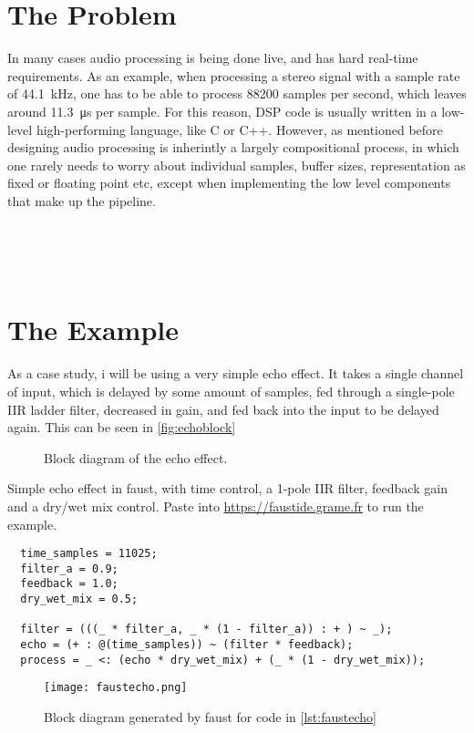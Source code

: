 \section{The Problem}

In many cases audio processing is being done live, and has hard real-time requirements. As an example, when
processing a stereo signal with a sample rate of \SI{44.1}{kHz}, one has to be able to process
\num{88200} samples per second, which leaves around \SI{11.3}{\micro\second} per sample. For this
reason, DSP code is usually written in a low-level high-performing language, like C or C++. However, as
mentioned before designing audio processing is inherintly a largely compositional process, in which one
rarely needs to worry about individual samples, buffer sizes, representation as fixed or floating point etc,
except when implementing the low level components that make up the pipeline.

 \\
 \\
 \\

\section{The Example}

As a case study, i will be using a very simple echo effect. It takes a single channel of input, which is
delayed by some amount of samples, fed through a single-pole IIR ladder filter, decreased in gain, and fed
back into the input to be delayed again. This can be seen in \autoref{fig:echoblock}

\begin{figure}
  \centering
  
  \caption{Block diagram of the echo effect.}
  \label{fig:echoblock}
\end{figure}

\begin{listing}
  \label{lst:faustecho}
  \caption{
    Simple echo effect in faust, with time control, a 1-pole IIR filter, feedback gain and a dry/wet mix control. Paste into \url{https://faustide.grame.fr} to run the example.
  }
  \begin{verbatim}
  time_samples = 11025;
  filter_a = 0.9;
  feedback = 1.0; 
  dry_wet_mix = 0.5;

  filter = (((_ * filter_a, _ * (1 - filter_a)) : + ) ~ _);
  echo = (+ : @(time_samples)) ~ (filter * feedback);
  process = _ <: (echo * dry_wet_mix) + (_ * (1 - dry_wet_mix));
  \end{verbatim}
\end{listing}

\begin{figure}
  \centering
  \def\svgwidth{\columnwidth}
  \texttt{[image: faustecho.png]}
  \caption{Block diagram generated by faust for code in \autoref{lst:faustecho}}
  \label{fig:faustecho}
\end{figure}
